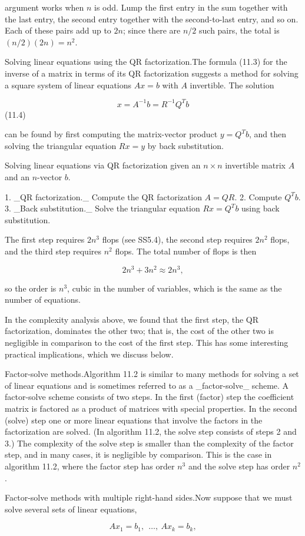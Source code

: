 argument works when \(n\) is odd. Lump the first entry in the sum together with the last entry, the second entry together with the second-to-last entry, and so on. Each of these pairs add up to \(2n\); since there are \(n/2\) such pairs, the total is \((n/2)(2n)=n^{2}\).

Solving linear equations using the QR factorization.The formula (11.3) for the inverse of a matrix in terms of its QR factorization suggests a method for solving a square system of linear equations \(Ax=b\) with \(A\) invertible. The solution

\[x=A^{-1}b=R^{-1}Q^{T}b\] (11.4)

can be found by first computing the matrix-vector product \(y=Q^{T}b\), and then solving the triangular equation \(Rx=y\) by back substitution.

Solving linear equations via QR factorization given an \(n\times n\) invertible matrix \(A\) and an \(n\)-vector \(b\).

1. _QR factorization._ Compute the QR factorization \(A=QR\).
2. Compute \(Q^{T}b\).
3. _Back substitution._ Solve the triangular equation \(Rx=Q^{T}b\) using back substitution.

The first step requires \(2n^{3}\) flops (see SS5.4), the second step requires \(2n^{2}\) flops, and the third step requires \(n^{2}\) flops. The total number of flops is then

\[2n^{3}+3n^{2}\approx 2n^{3},\]

so the order is \(n^{3}\), cubic in the number of variables, which is the same as the number of equations.

In the complexity analysis above, we found that the first step, the QR factorization, dominates the other two; that is, the cost of the other two is negligible in comparison to the cost of the first step. This has some interesting practical implications, which we discuss below.

Factor-solve methods.Algorithm 11.2 is similar to many methods for solving a set of linear equations and is sometimes referred to as a _factor-solve_ scheme. A factor-solve scheme consists of two steps. In the first (factor) step the coefficient matrix is factored as a product of matrices with special properties. In the second (solve) step one or more linear equations that involve the factors in the factorization are solved. (In algorithm 11.2, the solve step consists of steps 2 and 3.) The complexity of the solve step is smaller than the complexity of the factor step, and in many cases, it is negligible by comparison. This is the case in algorithm 11.2, where the factor step has order \(n^{3}\) and the solve step has order \(n^{2}\).

Factor-solve methods with multiple right-hand sides.Now suppose that we must solve several sets of linear equations,

\[Ax_{1}=b_{1},\ \ \ldots,\ Ax_{k}=b_{k},\] 